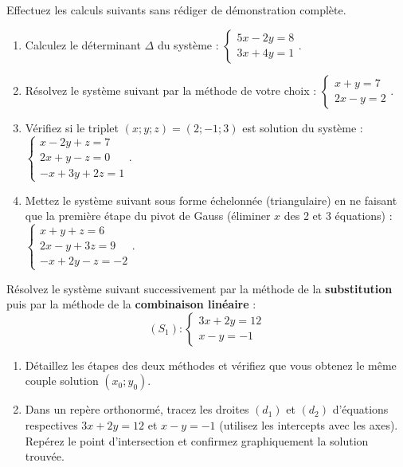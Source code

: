 \documentclass[11pt]{article}
\newcounter{popsec}
\newcounter{popsub}
\newcommand{\courssub}[1]{%
  \stepcounter{popsub}%
  \par\vspace{9pt}\noindent{\popxbold\fontsize{11.5}{13}\selectfont\color{popink}{\color{poporange}\thepopsec.\thepopsub}\hspace{6pt}#1}\par\nopagebreak\vspace{4pt}
}
\begin{document}
\begin{exercice}
Effectuez les calculs suivants sans rédiger de démonstration complète.
\begin{enumerate}
\item Calculez le déterminant $\Delta$ du système : $\begin{cases} 5x - 2y = 8 \\ 3x + 4y = 1 \end{cases}$.
\item Résolvez le système suivant par la méthode de votre choix : $\begin{cases} x + y = 7 \\ 2x - y = 2 \end{cases}$.
\item Vérifiez si le triplet $(x;y;z) = (2; -1; 3)$ est solution du système :
$\begin{cases} x - 2y + z = 7 \\ 2x + y - z = 0 \\ -x + 3y + 2z = 1 \end{cases}$.
\item Mettez le système suivant sous forme échelonnée (triangulaire) en ne faisant que la première étape du pivot de Gauss (éliminer $x$ des 2 et 3 équations) :
$\begin{cases} x + y + z = 6 \\ 2x - y + 3z = 9 \\ -x + 2y - z = -2 \end{cases}$.
\end{enumerate}
\end{exercice}

\courssub{Je m'entraîne}

\begin{exercice}
Résolvez le système suivant successivement par la méthode de la \textbf{substitution} puis par la méthode de la \textbf{combinaison linéaire} :
\[
(S_1) : \begin{cases}
3x + 2y = 12 \\
x - y = -1
\end{cases}
\]
\begin{enumerate}
\item Détaillez les étapes des deux méthodes et vérifiez que vous obtenez le même couple solution $(x_0; y_0)$.
\item Dans un repère orthonormé, tracez les droites $(d_1)$ et $(d_2)$ d'équations respectives $3x+2y=12$ et $x-y=-1$ (utilisez les intercepts avec les axes). Repérez le point d'intersection et confirmez graphiquement la solution trouvée.
\end{enumerate}
\end{exercice}
\end{document}
